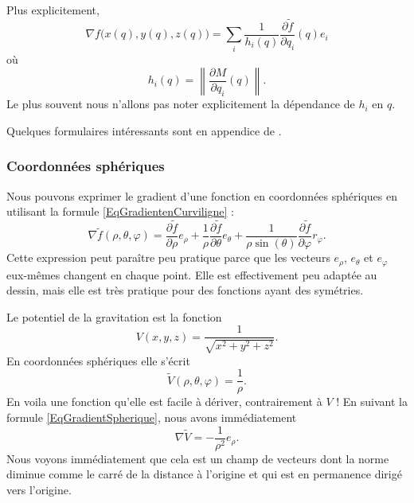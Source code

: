 Plus explicitement,
\begin{equation}        \label{EqGradientenCurviligne}
    \nabla f\big( x(q),y(q),z(q) \big)=\sum_i \frac{1}{ h_i(q) }\frac{ \partial \tilde f }{ \partial q_i }(q)e_i
\end{equation}
où
\begin{equation}
    h_i(q)=\left\| \frac{ \partial M }{ \partial q_i }(q) \right\|.
\end{equation}
Le plus souvent nous n'allons pas noter explicitement la dépendance de $h_i$ en $q$.

Quelques formulaires intéressants sont en appendice de \cite{Schomblond_em}.

\subsubsection{Coordonnées sphériques}

Nous pouvons exprimer le gradient d'une fonction en coordonnées sphériques en utilisant la formule \eqref{EqGradientenCurviligne} :
\begin{equation}        \label{EqGradientSpherique}
    \nabla\tilde f(\rho,\theta,\varphi)=\frac{ \partial \tilde f }{ \partial \rho }e_{\rho}+\frac{1}{ \rho }\frac{ \partial \tilde f }{ \partial \theta }e_{\theta}+\frac{1}{ \rho\sin(\theta) }\frac{ \partial \tilde f }{ \partial \varphi }r_{\varphi}.
\end{equation}
Cette expression peut paraître peu pratique parce que les vecteurs $e_{\rho}$, $e_{\theta}$ et $e_{\varphi}$ eux-mêmes changent en chaque point. Elle est effectivement peu adaptée au dessin, mais elle est très pratique pour des fonctions ayant des symétries.

\begin{example}
    Le potentiel de la gravitation est la fonction
    \begin{equation}
        V(x,y,z)=\frac{1}{ \sqrt{x^2+y^2+z^2} }.
    \end{equation}
    En coordonnées sphériques elle s'écrit
    \begin{equation}
        \tilde V(\rho,\theta,\varphi)=\frac{1}{ \rho }.
    \end{equation}
    En voila une fonction qu'elle est facile à dériver, contrairement à $V$ ! En suivant la formule \eqref{EqGradientSpherique}, nous avons immédiatement
    \begin{equation}
        \nabla\tilde V=-\frac{1}{ \rho^2 }e_{\rho}.
    \end{equation}
    Nous voyons immédiatement que cela est un champ de vecteurs dont la norme diminue comme le carré de la distance à l'origine et qui est en permanence dirigé vers l'origine.
\end{example}

